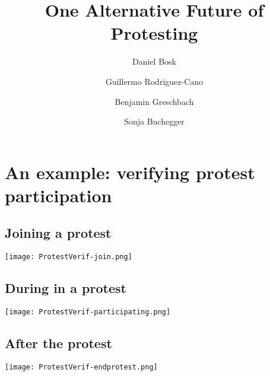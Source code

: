 \title{%
  One Alternative Future of Protesting
}
\author[<dbosk@kth.se>]{%
  Daniel Bosk \and
  Guillermo Rodriguez-Cano \and
  Benjamin Greschbach \and
  Sonja Buchegger
}


\mode*

\begin{abstract}
  
\end{abstract}


\section{An example: verifying protest participation}

\subsection{Joining a protest}

\begin{frame}
  \centering
  \texttt{[image: ProtestVerif-join.png]}
\end{frame}

\subsection{During in a protest}

\begin{frame}
  \centering
  \texttt{[image: ProtestVerif-participating.png]}
\end{frame}

\subsection{After the protest}

\begin{frame}
  \centering
  \texttt{[image: ProtestVerif-endprotest.png]}
\end{frame}

